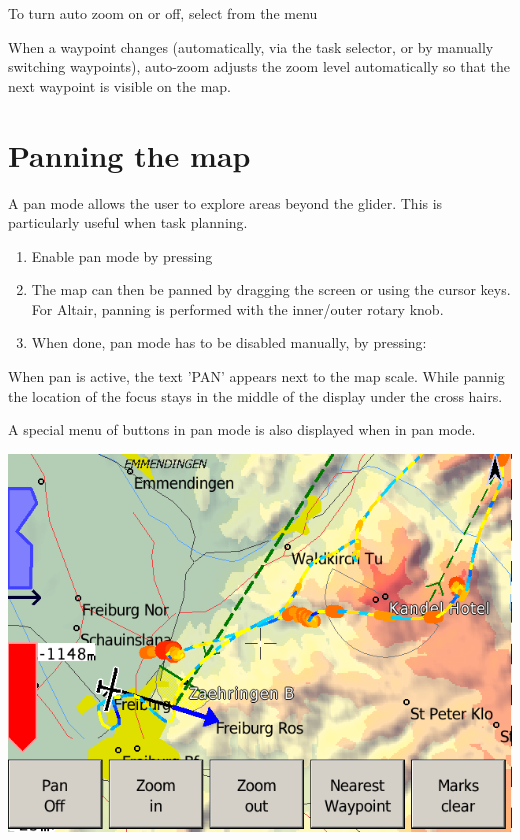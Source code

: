 \documentclass[a4paper,12pt]{refrep}
\begin{document}
To turn auto zoom on or off, select from the menu
\begin{quote}
\blink{}\blink{} 
\end{quote}

When a waypoint changes (automatically, via the task selector, or by
manually switching waypoints), auto-zoom adjusts the zoom level
automatically so that the next waypoint is visible on the map.


\section{Panning the map}

A pan mode allows the user to explore areas beyond the glider.  This
is particularly useful when task planning.
\begin{enumerate}
\item Enable pan mode by pressing 
\begin{quote}
\blink{}
\end{quote}

\item The map can then be panned by dragging the screen or using the cursor
  keys.  For Altair, panning is performed with the inner/outer rotary knob.
\item When done, pan mode has to be disabled manually, by pressing:
\begin{quote}
\blink{}
\end{quote}

\end{enumerate} 

When pan is active, the text 'PAN' appears next to the map scale.  While
pannig the location of the focus stays in the middle of the display under the
cross hairs.

A special menu of buttons in pan mode is also displayed when in pan
mode.

\begin{center}
\includegraphics[angle=0,width=\linewidth,keepaspectratio='true']{figures/pan.png}
\end{center}
\end{document}
